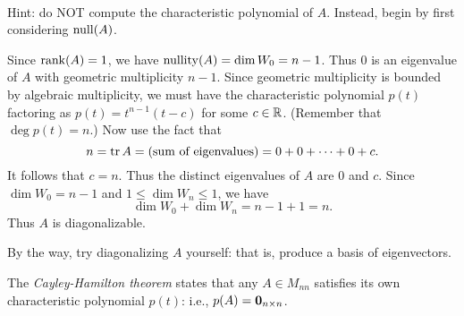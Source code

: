 \\
Hint: do NOT compute the characteristic polynomial of $A$. Instead, begin by first considering $\operatorname{null}(A)$. 
\\
\begin{solution}
\noindent 
Since $\operatorname{rank}(A)=1$, we have $\operatorname{nullity}(A)=\dim W_0=n-1$. Thus $0$ is an eigenvalue of $A$ with geometric multiplicity $n-1$. Since geometric multiplicity is bounded by algebraic multiplicity, we must have the characteristic polynomial $p(t)$ factoring as $p(t)=t^{n-1}(t-c)$ for some $c\in {\mathbb R}$. (Remember that $\deg p(t)=n$.) Now use the fact that 
\[
n=\operatorname{tr} A=(\text{sum of eigenvalues})=0+0+\cdots +0+c.
\]
It follows that $c=n$. Thus the distinct eigenvalues of $A$ are $0$ and $c$. Since $\dim W_0=n-1$ and $1\leq \dim W_n\leq 1$, we have 
\[
\dim W_0+\dim W_n=n-1+1=n.
\] 
Thus $A$ is diagonalizable. 

By the way, try diagonalizing $A$ yourself: that is, produce a basis of eigenvectors. 
\end{solution}
\ii The {\em Cayley-Hamilton theorem} states that any $A\in M_{nn}$ satisfies its own characteristic polynomial $p(t)$: i.e., $p(A)={\mathbf 0}_{n\times n}$. 

